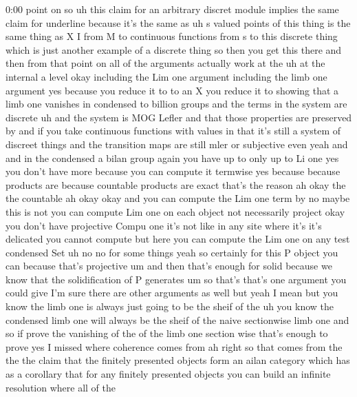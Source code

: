 \begin{unfinished}{0:00}
point  on  so  uh  this  claim  for  an
arbitrary  discret  module  implies  the
same  claim  for  underline  because  it's
the  same  as  uh  s  valued  points  of  this
thing  is  the  same  thing  as  X  I  from  M  to
continuous  functions  from  s  to  this
discrete  thing  which  is  just  another
example  of  a  discrete  thing  so  then  you
get  this  there  and  then  from  that  point
on  all  of  the  arguments  actually  work  at
the  uh  at  the  internal  a  level
okay  including  the  Lim  one  argument
including  the  limb  one  argument  yes
because  you  reduce  it  to  to  an
X  you  reduce  it  to  showing  that  a  limb
one  vanishes  in  condensed  to  billion
groups  and  the  terms  in  the  system  are
discrete  uh  and  the  system  is  MOG  Lefler
and  that  those  properties  are  preserved
by  and  if  you  take  continuous  functions
with  values  in  that  it's  still  a  system
of  discreet  things  and  the  transition
maps  are  still  mler  or  subjective  even
yeah  and  and  in  the
condensed  a  bilan  group  again  you  have
up  to  only  up  to  Li  one  yes  you  don't
have  more  because  you  can  compute  it
termwise
yes  because  because  products  are  because
countable  products  are
exact  that's  the
reason  ah  okay  the  the
countable  ah  okay  okay  and  you  can
compute  the  Lim  one  term  by  no  maybe
this  is
not  you  can  compute  Lim  one  on  each
object  not  necessarily  project  okay  you
don't  have
projective  Compu
one  it's  not  like  in  any  site  where  it's
it's  delicated  you  cannot
compute  but  here  you  can  compute  the  Lim
one  on  any  test  condensed  Set
uh  no  no  for  some  things  yeah  so
certainly  for  this  P  object  you  can
because  that's  projective
um  and  then  that's  enough  for  solid
because  we  know  that  the  solidification
of  P
generates  um  so  that's  that's  one
argument  you  could  give  I'm  sure  there
are  other  arguments  as  well  but  yeah  I
mean  but  you  know  the  limb  one  is  always
just  going  to  be  the  sheif  of  the  uh  you
know  the  condensed  limb  one  will  always
be  the  sheif  of  the  naive  sectionwise
limb  one  and  so  if  prove  the  vanishing
of  the  of  the  limb  one  section  wise
that's  enough  to
prove  yes  I  missed  where  coherence  comes
from  ah  right  so  that  comes  from  the  the
the  claim  that  the  finitely  presented
objects  form  an  ailan  category  which  has
as  a  corollary  that  for  any  finitely
presented  objects  you  can  build  an
infinite  resolution  where  all  of  the

\end{unfinished}
